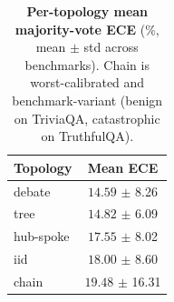\begin{table}[!t]
\centering
\small
\setlength{\tabcolsep}{6pt}
\begin{tabular}{l c}
\toprule
\textbf{Topology} & \textbf{Mean ECE} \\
\midrule
debate     & $14.59$ {\scriptsize $\pm$ 8.26} \\
tree       & $14.82$ {\scriptsize $\pm$ 6.09} \\
hub-spoke  & $17.55$ {\scriptsize $\pm$ 8.02} \\
iid        & $18.00$ {\scriptsize $\pm$ 8.60} \\
chain      & $19.48$ {\scriptsize $\pm$ 16.31} \\
\bottomrule
\end{tabular}
\caption{\textbf{Per-topology mean majority-vote ECE} (\%, mean
$\pm$ std across benchmarks). Chain is worst-calibrated and
benchmark-variant (benign on TriviaQA, catastrophic on
TruthfulQA).}
\label{tab:ece-by-topology}
\end{table}